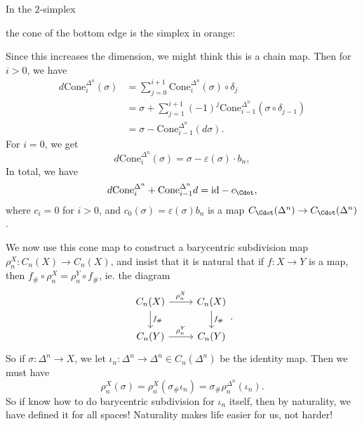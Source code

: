 \documentclass[a4paper]{article}
\theoremstyle{definition}
\begin{document}
\begin{eg}
  In the $2$-simplex
  \begin{center}
  \end{center}
  the cone of the bottom edge is the simplex in orange:
  \begin{center}
  \end{center}

\end{eg}
Since this increases the dimension, we might think this is a chain map. Then for $i > 0$, we have
\begin{align*}
  d \mathrm{Cone}_i^{\Delta^n}(\sigma) &= \sum_{j = 0}^{i + 1} \mathrm{Cone}_i^{\Delta^n}(\sigma) \circ \delta_j \\
  &= \sigma + \sum_{j = 1}^{i + 1} (-1)^j \mathrm{Cone}_{i - 1}^{\Delta^n} (\sigma \circ \delta_{j - 1})\\
  &= \sigma - \mathrm{Cone}_{i - 1}^{\Delta^n} (d \sigma).
\end{align*}
For $i = 0$, we get
\[
  d \mathrm{Cone}_i^{\Delta^n}(\sigma) = \sigma - \varepsilon(\sigma) \cdot b_n,
\]
In total, we have
\[
  d \mathrm{Cone}_i^{\Delta^n} + \mathrm{Cone}_{i - 1}^{\Delta^n} d = \mathrm{id} - c_{\Cdot},
\]
where $c_i = 0$ for $i > 0$, and $c_0(\sigma) = \varepsilon(\sigma) b_n$ is a map $C_\Cdot(\Delta^n) \to C_\Cdot(\Delta^n)$.

We now use this cone map to construct a barycentric subdivision map $\rho_n^X: C_n(X) \to C_n(X)$, and insist that it is natural that if $f: X \to Y$ is a map, then $f_\# \circ \rho_n^X = \rho_n^Y \circ f_\#$, ie. the diagram
\[
  \begin{tikzcd}
    C_n(X) \ar[r, "\rho_n^X"] \ar[d, "f_\#"] & C_n(X) \ar[d, "f_\#"]\\
    C_n(Y) \ar[r, "\rho_n^Y"] & C_n(Y)
  \end{tikzcd}.
\]
So if $\sigma: \Delta^n \to X$, we let $\iota_n: \Delta^n \to \Delta^n \in C_n(\Delta^n)$ be the identity map. Then we must have
\[
  \rho_n^X (\sigma) = \rho_n^X (\sigma_\# \iota_n) = \sigma_\# \rho_n^{\Delta^n}(\iota_n).
\]
So if know how to do barycentric subdivision for $\iota_n$ itself, then by naturality, we have defined it for all spaces! Naturality makes life easier for us, not harder!
\end{document}
